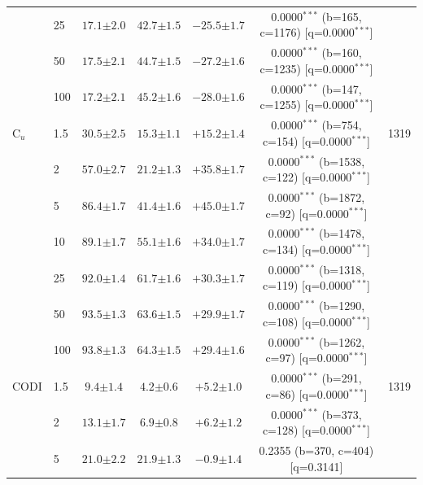 \begin{table}[h!]
\begin{tabular}{l l cccc c}
 & 25 & $17.1 {\scriptstyle \pm 2.0}$ & $42.7 {\scriptstyle \pm 1.5}$ & $-25.5 {\scriptstyle \pm 1.7}$ & 0.0000$^{***}$ (b=165, c=1176) [q=0.0000$^{***}$] &  \\
 & 50 & $17.5 {\scriptstyle \pm 2.1}$ & $44.7 {\scriptstyle \pm 1.5}$ & $-27.2 {\scriptstyle \pm 1.6}$ & 0.0000$^{***}$ (b=160, c=1235) [q=0.0000$^{***}$] &  \\
 & 100 & $17.2 {\scriptstyle \pm 2.1}$ & $45.2 {\scriptstyle \pm 1.6}$ & $-28.0 {\scriptstyle \pm 1.6}$ & 0.0000$^{***}$ (b=147, c=1255) [q=0.0000$^{***}$] &  \\
\midrule
C$_u$ & 1.5 & $30.5 {\scriptstyle \pm 2.5}$ & $15.3 {\scriptstyle \pm 1.1}$ & $+15.2 {\scriptstyle \pm 1.4}$ & 0.0000$^{***}$ (b=754, c=154) [q=0.0000$^{***}$] & 1319 \\
 & 2 & $57.0 {\scriptstyle \pm 2.7}$ & $21.2 {\scriptstyle \pm 1.3}$ & $+35.8 {\scriptstyle \pm 1.7}$ & 0.0000$^{***}$ (b=1538, c=122) [q=0.0000$^{***}$] &  \\
 & 5 & $86.4 {\scriptstyle \pm 1.7}$ & $41.4 {\scriptstyle \pm 1.6}$ & $+45.0 {\scriptstyle \pm 1.7}$ & 0.0000$^{***}$ (b=1872, c=92) [q=0.0000$^{***}$] &  \\
 & 10 & $89.1 {\scriptstyle \pm 1.7}$ & $55.1 {\scriptstyle \pm 1.6}$ & $+34.0 {\scriptstyle \pm 1.7}$ & 0.0000$^{***}$ (b=1478, c=134) [q=0.0000$^{***}$] &  \\
 & 25 & $92.0 {\scriptstyle \pm 1.4}$ & $61.7 {\scriptstyle \pm 1.6}$ & $+30.3 {\scriptstyle \pm 1.7}$ & 0.0000$^{***}$ (b=1318, c=119) [q=0.0000$^{***}$] &  \\
 & 50 & $93.5 {\scriptstyle \pm 1.3}$ & $63.6 {\scriptstyle \pm 1.5}$ & $+29.9 {\scriptstyle \pm 1.7}$ & 0.0000$^{***}$ (b=1290, c=108) [q=0.0000$^{***}$] &  \\
 & 100 & $93.8 {\scriptstyle \pm 1.3}$ & $64.3 {\scriptstyle \pm 1.5}$ & $+29.4 {\scriptstyle \pm 1.6}$ & 0.0000$^{***}$ (b=1262, c=97) [q=0.0000$^{***}$] &  \\
\midrule
CODI & 1.5 & $9.4 {\scriptstyle \pm 1.4}$ & $4.2 {\scriptstyle \pm 0.6}$ & $+5.2 {\scriptstyle \pm 1.0}$ & 0.0000$^{***}$ (b=291, c=86) [q=0.0000$^{***}$] & 1319 \\
 & 2 & $13.1 {\scriptstyle \pm 1.7}$ & $6.9 {\scriptstyle \pm 0.8}$ & $+6.2 {\scriptstyle \pm 1.2}$ & 0.0000$^{***}$ (b=373, c=128) [q=0.0000$^{***}$] &  \\
 & 5 & $21.0 {\scriptstyle \pm 2.2}$ & $21.9 {\scriptstyle \pm 1.3}$ & $-0.9 {\scriptstyle \pm 1.4}$ & 0.2355 (b=370, c=404) [q=0.3141] &  \\

\end{tabular}
\end{table}
